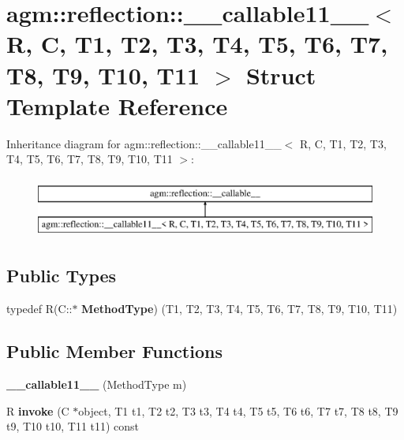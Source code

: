 \hypertarget{structagm_1_1reflection_1_1____callable11____}{}\section{agm\+:\+:reflection\+:\+:\+\_\+\+\_\+callable11\+\_\+\+\_\+$<$ R, C, T1, T2, T3, T4, T5, T6, T7, T8, T9, T10, T11 $>$ Struct Template Reference}
\label{structagm_1_1reflection_1_1____callable11____}
Inheritance diagram for agm\+:\+:reflection\+:\+:\+\_\+\+\_\+callable11\+\_\+\+\_\+$<$ R, C, T1, T2, T3, T4, T5, T6, T7, T8, T9, T10, T11 $>$\+:\begin{figure}[H]
\begin{center}
\leavevmode
\includegraphics[height=2.000000cm]{structagm_1_1reflection_1_1____callable11____}
\end{center}
\end{figure}
\subsection*{Public Types}
\begin{DoxyCompactItemize}
\item 
typedef R(C\+::$\ast$ {\bfseries Method\+Type}) (T1, T2, T3, T4, T5, T6, T7, T8, T9, T10, T11)\hypertarget{structagm_1_1reflection_1_1____callable11_____adb4f058cf5bdc8ade5585c3ad75582be}{}\label{structagm_1_1reflection_1_1____callable11_____adb4f058cf5bdc8ade5585c3ad75582be}

\end{DoxyCompactItemize}
\subsection*{Public Member Functions}
\begin{DoxyCompactItemize}
\item 
{\bfseries \+\_\+\+\_\+callable11\+\_\+\+\_\+} (Method\+Type m)\hypertarget{structagm_1_1reflection_1_1____callable11_____a0cba5091febd507db7c49863ea1c8663}{}\label{structagm_1_1reflection_1_1____callable11_____a0cba5091febd507db7c49863ea1c8663}

\item 
R {\bfseries invoke} (C $\ast$object, T1 t1, T2 t2, T3 t3, T4 t4, T5 t5, T6 t6, T7 t7, T8 t8, T9 t9, T10 t10, T11 t11) const \hypertarget{structagm_1_1reflection_1_1____callable11_____a91ac3b19c6db38df51575864e90c6744}{}\label{structagm_1_1reflection_1_1____callable11_____a91ac3b19c6db38df51575864e90c6744}

\end{DoxyCompactItemize}
